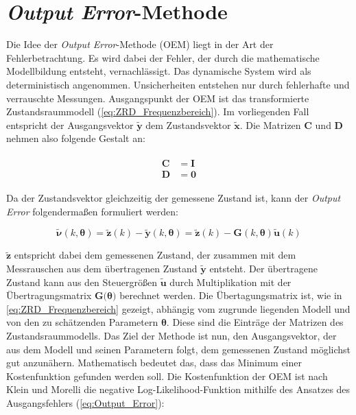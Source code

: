 \section{\textit{Output Error}-Methode}

Die Idee der \textit{Output Error}-Methode (OEM) liegt in der Art der Fehlerbetrachtung. Es wird dabei der Fehler, der durch 
die 
mathematische Modellbildung entsteht, vernachlässigt. Das dynamische System wird als deterministisch angenommen. 
Unsicherheiten entstehen nur durch fehlerhafte und verrauschte Messungen. Ausgangspunkt der OEM ist das transformierte 
Zustandsraummodell (\ref{eq:ZRD_Frequenzbereich}). Im vorliegenden Fall entspricht der Ausgangsvektor $\mathbf{\tilde{y}}$ 
dem 
Zustandsvektor $\mathbf{\tilde{x}}$. Die Matrizen $\mathbf{C}$ und $\mathbf{D}$ nehmen also folgende Gestalt an:

\begin{align}
	\begin{split}
		\mathbf{C} &= \mathbf{I} \\
		\mathbf{D} &= \mathbf{0}          
		\label{eq:CD}
	\end{split}
\end{align}

Da der Zustandsvektor gleichzeitig der gemessene Zustand ist, kann der \textit{Output Error} folgendermaßen formuliert werden:

\begin{equation}
    \mathbf{\tilde{\nu}}(k,\mathbf{\theta}) = \mathbf{\tilde{z}}(k)-\mathbf{\tilde{y}}(k,\mathbf{\theta}) = \mathbf{\tilde{z}}(k)-\mathbf{G}(k,\mathbf{\theta})\mathbf{\tilde{u}}(k)  
	\label{eq:Output_Error}
\end{equation}

$\mathbf{\tilde{z}}$ entspricht dabei dem gemessenen Zustand, der zusammen mit dem Messrauschen aus dem 
übertragenen Zustand 
$\mathbf{\tilde{y}}$ entsteht. Der übertragene Zustand kann aus den Steuergrößen $\mathbf{\tilde{u}}$ durch Multiplikation 
mit der Übertragungsmatrix $\mathbf{G}(\mathbf{\theta)}$ berechnet werden. Die Übertagungsmatrix ist, wie in 
\cref{eq:ZRD_Frequenzbereich} gezeigt, abhängig vom zugrunde liegenden Modell und von den zu schätzenden Parametern 
$\mathbf{\theta}$. Diese sind die Einträge der Matrizen des Zustandsraummodells. Das Ziel der Methode ist nun, den 
Ausgangsvektor, der aus dem Modell und seinen Parametern folgt, dem gemessenen Zustand möglichst gut anzunähern. Mathematisch 
bedeutet das, dass das Minimum einer Kostenfunktion gefunden werden soll. Die Kostenfunktion der OEM ist nach Klein und 
Morelli \cite{Klein2006} die negative Log-Likelihood-Funktion mithilfe des Ansatzes des Ausgangsfehlers 
(\ref{eq:Output_Error}):

